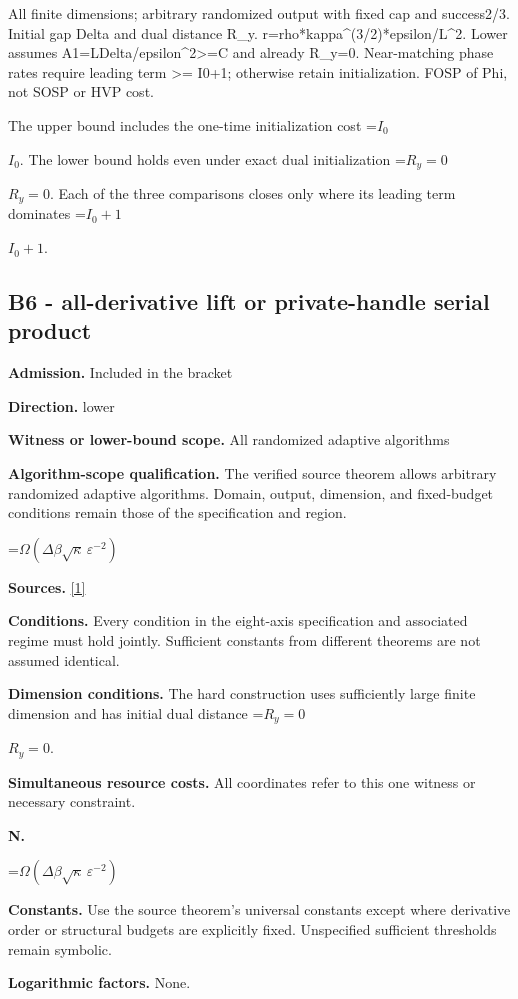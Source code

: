 \documentclass[10pt,a4paper]{article}
\newcommand{\AtlasMath}[1]{\par\begingroup\centering\setbox0=\hbox{$\displaystyle #1$}\ifdim\wd0>1.4\linewidth\typeout{ATLAS WIDE FORMULA: \the\wd0}\fi\ifdim\wd0>\linewidth\resizebox{\linewidth}{!}{\box0}\else\box0\fi\par\endgroup}
\newcommand{\AtlasInlineMath}[1]{\begingroup\setbox0=\hbox{$#1$}\ifdim\wd0>.4\linewidth\endgroup\AtlasMath{#1}\else\endgroup$#1$\fi}
\begin{document}
All finite dimensions; arbitrary randomized output with fixed cap and success2/3. Initial gap Delta and dual distance R\_y. r=rho*kappa\textasciicircum{}(3/2)*epsilon/L\textasciicircum{}2. Lower assumes A1=LDelta/epsilon\textasciicircum{}2>=C and already R\_y=0. Near-matching phase rates require leading term >= I0+1; otherwise retain initialization. FOSP of Phi, not SOSP or HVP cost.

The upper bound includes the one-time initialization cost \AtlasInlineMath{I_0}. The lower bound holds even under exact dual initialization \AtlasInlineMath{R_y=0}. Each of the three comparisons closes only where its leading term dominates \AtlasInlineMath{I_0+1}.

\subsection{B6 - all-derivative lift or private-handle serial product}
\textbf{Admission.} Included in the bracket

\textbf{Direction.} lower

\textbf{Witness or lower-bound scope.} All randomized adaptive algorithms

\textbf{Algorithm-scope qualification.} The verified source theorem allows arbitrary randomized adaptive algorithms. Domain, output, dimension, and fixed-budget conditions remain those of the specification and region.

\AtlasMath{\Omega(\Delta\beta\sqrt\kappa\,\varepsilon^{-2})}
\textbf{Sources.} \href{https://arxiv.org/pdf/2610.16771v2}{[1]}

\textbf{Conditions.} Every condition in the eight-axis specification and associated regime must hold jointly. Sufficient constants from different theorems are not assumed identical.

\textbf{Dimension conditions.} The hard construction uses sufficiently large finite dimension and has initial dual distance \AtlasInlineMath{R_y=0}.

\textbf{Simultaneous resource costs.} All coordinates refer to this one witness or necessary constraint.

\textbf{N.}

\AtlasMath{\Omega(\Delta\beta\sqrt\kappa\,\varepsilon^{-2})}
\textbf{Constants.} Use the source theorem’s universal constants except where derivative order or structural budgets are explicitly fixed. Unspecified sufficient thresholds remain symbolic.

\textbf{Logarithmic factors.} None.
\end{document}

